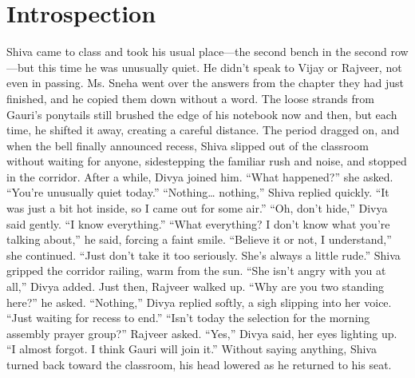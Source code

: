 \chapter{Introspection}
Shiva came to class and took his usual place—the second bench in the second row—but this time he was unusually quiet. He didn't speak to Vijay or Rajveer, not even in passing. Ms. Sneha went over the answers from the chapter they had just finished, and he copied them down without a word. The loose strands from Gauri's ponytails still brushed the edge of his notebook now and then, but each time, he shifted it away, creating a careful distance. The period dragged on, and when the bell finally announced recess, Shiva slipped out of the classroom without waiting for anyone, sidestepping the familiar rush and noise, and stopped in the corridor. After a while, Divya joined him. ``What happened?'' she asked. ``You're unusually quiet today.'' ``Nothing… nothing,'' Shiva replied quickly. ``It was just a bit hot inside, so I came out for some air.'' ``Oh, don't hide,'' Divya said gently. ``I know everything.'' ``What everything? I don't know what you're talking about,'' he said, forcing a faint smile. ``Believe it or not, I understand,'' she continued. ``Just don't take it too seriously. She's always a little rude.'' Shiva gripped the corridor railing, warm from the sun. ``She isn't angry with you at all,'' Divya added. Just then, Rajveer walked up. ``Why are you two standing here?'' he asked. ``Nothing,'' Divya replied softly, a sigh slipping into her voice. ``Just waiting for recess to end.'' ``Isn't today the selection for the morning assembly prayer group?'' Rajveer asked. ``Yes,'' Divya said, her eyes lighting up. ``I almost forgot. I think Gauri will join it.'' Without saying anything, Shiva turned back toward the classroom, his head lowered as he returned to his seat.

